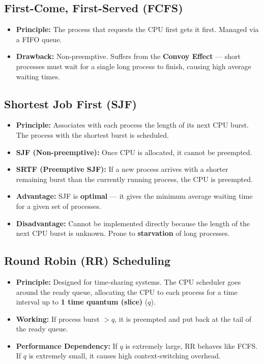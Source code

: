 \documentclass[12pt,a4paper]{article}
\begin{document}
\subsection{First-Come, First-Served (FCFS)}
\begin{itemize}[leftmargin=*, itemsep=3pt]
  \item \textbf{Principle:} The process that requests the CPU first gets it first. Managed via a FIFO queue.
  \item \textbf{Drawback:} Non-preemptive. Suffers from the \textbf{Convoy Effect} --- short processes must wait for a single long process to finish, causing high average waiting times.
\end{itemize}

\subsection{Shortest Job First (SJF)}
\begin{itemize}[leftmargin=*, itemsep=3pt]
  \item \textbf{Principle:} Associates with each process the length of its next CPU burst. The process with the shortest burst is scheduled.
  \item \textbf{SJF (Non-preemptive):} Once CPU is allocated, it cannot be preempted.
  \item \textbf{SRTF (Preemptive SJF):} If a new process arrives with a shorter remaining burst than the currently running process, the CPU is preempted.
  \item \textbf{Advantage:} SJF is \textbf{optimal} --- it gives the minimum average waiting time for a given set of processes.
  \item \textbf{Disadvantage:} Cannot be implemented directly because the length of the next CPU burst is unknown. Prone to \textbf{starvation} of long processes.
\end{itemize}

\subsection{Round Robin (RR) Scheduling}
\begin{itemize}[leftmargin=*, itemsep=3pt]
  \item \textbf{Principle:} Designed for time-sharing systems. The CPU scheduler goes around the ready queue, allocating the CPU to each process for a time interval up to \textbf{1 time quantum (slice)} ($q$).
  \item \textbf{Working:} If process burst $> q$, it is preempted and put back at the tail of the ready queue.
  \item \textbf{Performance Dependency:} If $q$ is extremely large, RR behaves like FCFS. If $q$ is extremely small, it causes high context-switching overhead.
\end{itemize}
\end{document}
